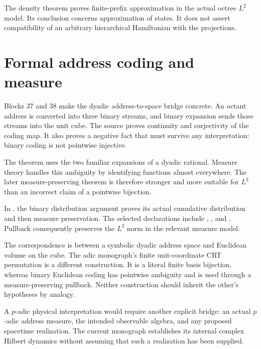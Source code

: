 The density theorem  proves finite-prefix approximation in the actual octree \(L^2\) model. Its conclusion concerns approximation of states. It does not assert compatibility of an arbitrary hierarchical Hamiltonian with the projections.



\clearpage
\section{Formal address coding and measure}\label{a-verify-formal-coding}

Blocks 37 and 38 make the dyadic address-to-space bridge concrete. An octant address is converted into three binary streams, and binary expansion sends those streams into the unit cube. The source proves continuity and surjectivity of the coding map. It also proves a negative fact that must survive any interpretation: binary coding is not pointwise injective.

The theorem  uses the two familiar expansions of a dyadic rational. Measure theory handles this ambiguity by identifying functions almost everywhere. The later measure-preserving theorem is therefore stronger and more suitable for \(L^2\) than an incorrect claim of a pointwise bijection.

In , the binary distribution argument proves its actual cumulative distribution and then measure preservation. The selected declarations include , , and . Pullback consequently preserves the \(L^2\) norm in the relevant measure model.

The correspondence is between a symbolic dyadic address space and Euclidean volume on the cube. The adic monograph's finite unit-coordinate CRT permutation is a different construction. It is a literal finite basis bijection, whereas binary Euclidean coding has pointwise ambiguity and is used through a measure-preserving pullback. Neither construction should inherit the other's hypotheses by analogy.

A \(p\)-adic physical interpretation would require another explicit bridge: an actual \(p\)-adic address measure, the intended observable algebra, and any proposed spacetime realization. The current monograph establishes its internal complex Hilbert dynamics without assuming that such a realization has been supplied.



